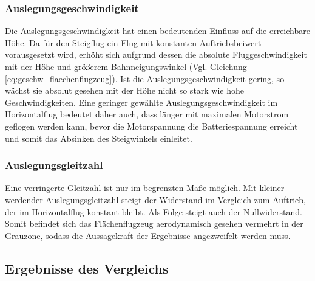 \subsubsection{Auslegungsgeschwindigkeit}
Die Auslegungsgeschwindigkeit hat einen bedeutenden Einfluss auf die erreichbare Höhe. Da für den Steigflug ein Flug mit konstanten Auftriebsbeiwert vorausgesetzt wird, erhöht sich aufgrund dessen die absolute Fluggeschwindigkeit mit der Höhe und größerem Bahnneigungswinkel (Vgl. Gleichung \ref{eq:geschw_flaechenflugzeug}). Ist die Auslegungsgeschwindigkeit gering, so wächst sie absolut gesehen mit der Höhe nicht so stark wie hohe Geschwindigkeiten. Eine geringer gewählte Auslegungsgeschwindigkeit im Horizontalflug bedeutet daher auch, dass länger mit maximalen Motorstrom geflogen werden kann, bevor die Motorspannung die Batteriespannung erreicht und somit das Absinken des Steigwinkels einleitet.



\subsubsection{Auslegungsgleitzahl}
Eine verringerte Gleitzahl ist nur im begrenzten Maße möglich. Mit kleiner werdender Auslegungsgleitzahl steigt 
der Widerstand im Vergleich zum Auftrieb, der im Horizontalflug konstant bleibt. Als Folge steigt auch der Nullwiderstand. Somit befindet sich das Flächenflugzeug aerodynamisch gesehen vermehrt in der Grauzone, sodass die Aussagekraft der Ergebnisse angezweifelt werden muss. 

\subsection{Ergebnisse des Vergleichs} 




